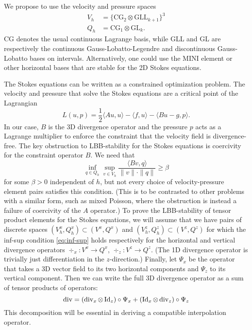 \documentclass{article}
\theoremstyle{definition}
\theoremstyle{plain}
\renewcommand{\div}[1]{\operatorname{div} #1} %
\newcommand{\Id}[1]{\operatorname{Id} #1}
\begin{document}
We propose to use the velocity and pressure spaces
\begin{align}
    V_h & = \{\text{CG}_2 \otimes \text{GLL}_{k + 1}\}^3 \\
    Q_h & = \text{CG}_1 \otimes \text{GL}_k.
\end{align}
CG denotes the usual continuous Lagrange basis, while GLL and GL are respectively the continuous Gauss-Lobatto-Legendre and discontinuous Gauss-Lobatto bases on intervals.
Alternatively, one could use the MINI element or other horizontal bases that are stable for the 2D Stokes equations.

The Stokes equations can be written as a constrained optimization problem.
The velocity and pressure that solve the Stokes equations are a critical point of the Lagrangian
\begin{equation}
    L(u, p) = \frac{1}{2}\langle Au, u\rangle - \langle f, u\rangle - \langle Bu - g, p\rangle.
\end{equation}
In our case, $B$ is the 3D divergence operator and the pressure $p$ acts as a Lagrange multiplier to enforce the constraint that the velocity field is divergence-free.
The key obstruction to LBB-stability for the Stokes equations is coercivity for the constraint operator $B$.
We need that
\begin{equation}
    \inf_{q\in Q_h}\sup_{v\in V_h}\frac{\langle Bv, q\rangle}{\|v\|\cdot\|q\|} \ge \beta
    \label{eq:inf-sup}
\end{equation}
for some $\beta > 0$ independent of $h$, but not every choice of velocity-pressure element pairs satisfies this condition.
(This is to be contrasted to other problems with a similar form, such as mixed Poisson, where the obstruction is instead a failure of coercivity of the $A$ operator.)
To prove the LBB-stability of tensor product elements for the Stokes equations, we will assume that we have pairs of discrete spaces $(V_h^x, Q_h^x) \subset (V^x, Q^x)$ and $(V_h^z, Q_h^z) \subset (V^z, Q^z)$ for which the inf-sup condition \eqref{eq:inf-sup} holds respectively for the horizontal and vertical divergence operators $\div_x : V^x \to Q^x$, $\div_z : V^z \to Q^z$.
(The 1D divergence operator is trivially just differentiation in the $z$-direction.)
Finally, let $\Psi_x$ be the operator that takes a 3D vector field to its two horizontal components and $\Psi_z$ to its vertical component.
Then we can write the full 3D divergence operator as a sum of tensor products of operators:
\begin{equation}
    \div = (\div_x \otimes \Id_z)\circ\Psi_x + (\Id_x \otimes \div_z)\circ\Psi_z
    \label{eq:divergence-breakdown}
\end{equation}
This decomposition will be essential in deriving a compatible interpolation operator.
\end{document}
